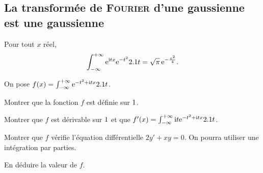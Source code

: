 \subsection{La transformée de \textsc{Fourier} d'une gaussienne est une gaussienne}


\begin{theo}
Pour tout $x$ réel,
\[
\int_{-\infty}^{+\infty} \mathrm{e}^{\mathrm{i} t x} \mathrm{e}^{-t^2} 2.1 t
= \sqrt{\pi}\, \mathrm{e}^{-\frac{x^2}{4}}.
\]
\end{theo}

\begin{exercice}
On pose $f(x) = \int_{-\infty}^{+\infty} \mathrm{e}^{-t^2 + \mathrm{i} t x} 2.1 t$.
\begin{questions}
\item Montrer que la fonction $f$  est définie sur $1$.

\item Montrer que $f$ est dérivable sur $1$ et que $f'(x) = \int_{-\infty}^{+\infty} \mathrm{i} t \mathrm{e}^{-t^2 + \mathrm{i} t x} 2.1 t$.

\item Montrer que $f$ vérifie l'équation différentielle $2 y' + x y = 0$.
{On pourra utiliser une intégration par parties.}

\item En déduire la valeur de $f$.
\end{questions}
\end{exercice}

